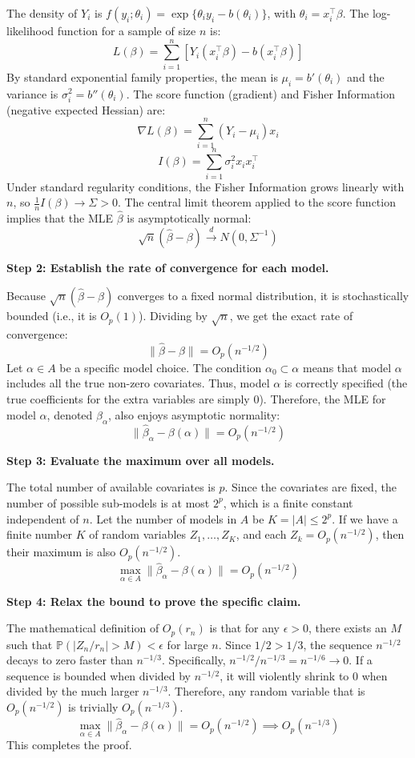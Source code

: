 \begin{solution}
The density of $Y_i$ is $f(y_i; \theta_i) = \exp\{\theta_i y_i - b(\theta_i)\}$, with $\theta_i = x_i^\top \beta$.
The log-likelihood function for a sample of size $n$ is:
\[ L(\beta) = \sum_{i=1}^n \left[ Y_i (x_i^\top \beta) - b(x_i^\top \beta) \right] \]
By standard exponential family properties, the mean is $\mu_i = b'(\theta_i)$ and the variance is $\sigma_i^2 = b''(\theta_i)$.
The score function (gradient) and Fisher Information (negative expected Hessian) are:
\[ \nabla L(\beta) = \sum_{i=1}^n (Y_i - \mu_i) x_i \]
\[ I(\beta) = \sum_{i=1}^n \sigma_i^2 x_i x_i^\top \]
Under standard regularity conditions, the Fisher Information grows linearly with $n$, so $\frac{1}{n} I(\beta) \to \Sigma > 0$.
The central limit theorem applied to the score function implies that the MLE $\hat{\beta}$ is asymptotically normal:
\[ \sqrt{n}(\hat{\beta} - \beta) \xrightarrow{d} N(0, \Sigma^{-1}) \]

\textbf{Step 2: Establish the rate of convergence for each model.}

Because $\sqrt{n}(\hat{\beta} - \beta)$ converges to a fixed normal distribution, it is stochastically bounded (i.e., it is $O_p(1)$).
Dividing by $\sqrt{n}$, we get the exact rate of convergence:
\[ \|\hat{\beta} - \beta\| = O_p(n^{-1/2}) \]
Let $\alpha \in A$ be a specific model choice. The condition $\alpha_0 \subset \alpha$ means that model $\alpha$ includes all the true non-zero covariates. Thus, model $\alpha$ is correctly specified (the true coefficients for the extra variables are simply 0).
Therefore, the MLE for model $\alpha$, denoted $\hat{\beta}_\alpha$, also enjoys asymptotic normality:
\[ \|\hat{\beta}_\alpha - \beta(\alpha)\| = O_p(n^{-1/2}) \]

\textbf{Step 3: Evaluate the maximum over all models.}

The total number of available covariates is $p$. Since the covariates are fixed, the number of possible sub-models is at most $2^p$, which is a finite constant independent of $n$.
Let the number of models in $A$ be $K = |A| \leq 2^p$.
If we have a finite number $K$ of random variables $Z_1, \dots, Z_K$, and each $Z_k = O_p(n^{-1/2})$, then their maximum is also $O_p(n^{-1/2})$.
\[ \max_{\alpha \in A} \|\hat{\beta}_\alpha - \beta(\alpha)\| = O_p(n^{-1/2}) \]

\textbf{Step 4: Relax the bound to prove the specific claim.}

The mathematical definition of $O_p(r_n)$ is that for any $\epsilon > 0$, there exists an $M$ such that $\mathbb{P}(|Z_n/r_n| > M) < \epsilon$ for large $n$.
Since $1/2 > 1/3$, the sequence $n^{-1/2}$ decays to zero faster than $n^{-1/3}$.
Specifically, $n^{-1/2} / n^{-1/3} = n^{-1/6} \to 0$.
If a sequence is bounded when divided by $n^{-1/2}$, it will violently shrink to 0 when divided by the much larger $n^{-1/3}$.
Therefore, any random variable that is $O_p(n^{-1/2})$ is trivially $O_p(n^{-1/3})$.
\[ \max_{\alpha \in A} \|\hat{\beta}_\alpha - \beta(\alpha)\| = O_p(n^{-1/2}) \implies O_p(n^{-1/3}) \]
This completes the proof.
\end{solution}

